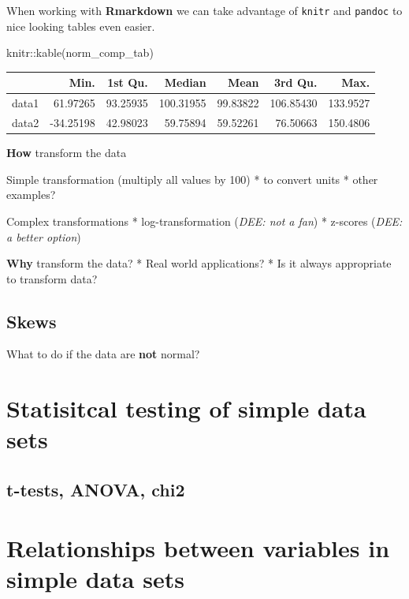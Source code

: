 \documentclass[
]{book}
\newenvironment{Shaded}{\begin{snugshade}}{\end{snugshade}}
\newcommand{\FunctionTok}[1]{\textcolor[rgb]{0.00,0.00,0.00}{#1}}
\newcommand{\NormalTok}[1]{#1}
\newcommand{\SpecialCharTok}[1]{\textcolor[rgb]{0.00,0.00,0.00}{#1}}
\begin{document}
When working with \textbf{Rmarkdown} we can take advantage of \texttt{knitr} and \texttt{pandoc} to nice looking tables even easier.

\begin{Shaded}
\begin{Highlighting}[]
\NormalTok{knitr}\SpecialCharTok{::}\FunctionTok{kable}\NormalTok{(norm\_comp\_tab)}
\end{Highlighting}
\end{Shaded}

\begin{tabular}{l|r|r|r|r|r|r}
\hline
  & Min. & 1st Qu. & Median & Mean & 3rd Qu. & Max.\\
\hline
data1 & 61.97265 & 93.25935 & 100.31955 & 99.83822 & 106.85430 & 133.9527\\
\hline
data2 & -34.25198 & 42.98023 & 59.75894 & 59.52261 & 76.50663 & 150.4806\\
\hline
\end{tabular}

\textbf{How} transform the data

Simple transformation (multiply all values by 100)
* to convert units
* other examples?

Complex transformations
* log-transformation (\emph{DEE: not a fan})
* z-scores (\emph{DEE: a better option})

\textbf{Why} transform the data?
* Real world applications?
* Is it always appropriate to transform data?

\hypertarget{skews}{%
\subsection{Skews}\label{skews}}

What to do if the data are \textbf{not} normal?

\hypertarget{statisitcal-testing-of-simple-data-sets}{%
\section{Statisitcal testing of simple data sets}\label{statisitcal-testing-of-simple-data-sets}}

\hypertarget{t-tests-anova-chi2}{%
\subsection{t-tests, ANOVA, chi2}\label{t-tests-anova-chi2}}

\hypertarget{relationships-between-variables-in-simple-data-sets}{%
\section{Relationships between variables in simple data sets}\label{relationships-between-variables-in-simple-data-sets}}
\end{document}
